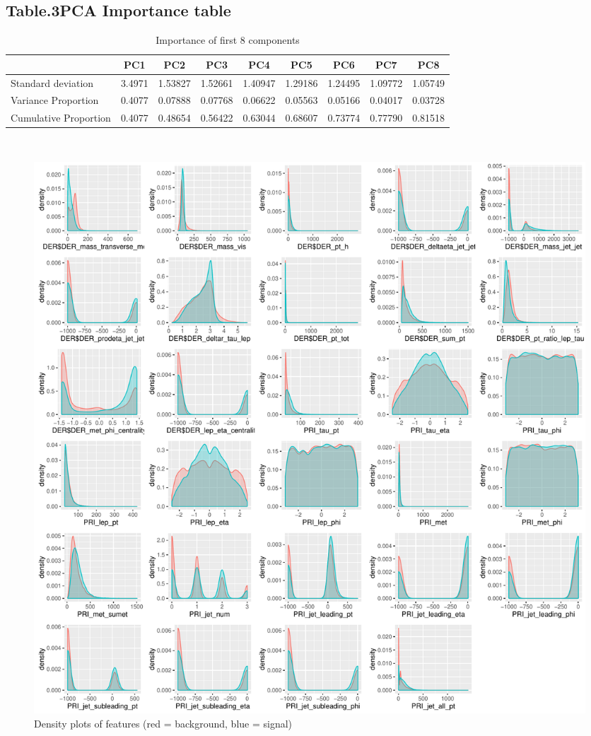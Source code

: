 \documentclass[11pt]{article}
\begin{document}
\subsection*{Table.3\quad PCA Importance table}
 \begin{table}[!ht]
     \centering
     \begin{tabular}{|p{1.8cm}|c|c|c|c|c|c|c|c| }
     \hline
       & PC1 & PC2 & PC3 & PC4 & PC5 & PC6 & PC7 & PC8\\ 
     \hline
       Standard deviation & 3.4971 & 1.53827 &1.52661 & 1.40947 & 1.29186 & 1.24495 & 1.09772 & 1.05749\\ 
     \hline
       Variance Proportion & 0.4077 & 0.07888 & 0.07768 & 0.06622 & 0.05563 & 0.05166 & 0.04017 & 0.03728\\ 
     \hline
       Cumulative Proportion & 0.4077 & 0.48654 & 0.56422 & 0.63044 & 0.68607 & 0.73774 & 0.77790 & 0.81518\\ 
     \hline
     \end{tabular}\\
     \caption{Importance of first 8 components}
     \label{tab:my_label}
 \end{table}

\clearpage

\begin{figure}[!ht]
\centering
\includegraphics[width=1.05\linewidth]{eda_density_plots.pdf}
\caption{Density plots of features (red = background, blue = signal)}
\end{figure}
\end{document}
